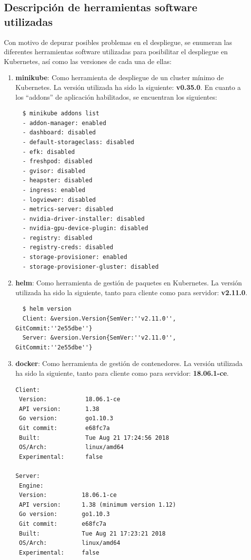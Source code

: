 \documentclass[12pt,spanish]{article}
\begin{document}
\subsection{Descripción de herramientas software utilizadas}
Con motivo de depurar posibles problemas en el despliegue, se enumeran las diferentes herramientas software utilizadas para posibilitar el despliegue en Kubernetes, así como las versiones de cada una de ellas:

\begin{enumerate}
\item{\textbf{minikube}:} Como herramienta de despliegue de un cluster mínimo de Kubernetes. La versión utilizada ha sido la siguiente: \textbf{v0.35.0}.
  En cuanto a los ``addons'' de aplicación habilitados, se encuentran los siguientes:
\begin{verbatim}
  $ minikube addons list
  - addon-manager: enabled
  - dashboard: disabled
  - default-storageclass: disabled
  - efk: disabled
  - freshpod: disabled
  - gvisor: disabled
  - heapster: disabled
  - ingress: enabled
  - logviewer: disabled
  - metrics-server: disabled
  - nvidia-driver-installer: disabled
  - nvidia-gpu-device-plugin: disabled
  - registry: disabled
  - registry-creds: disabled
  - storage-provisioner: enabled
  - storage-provisioner-gluster: disabled
\end{verbatim}

\item{\textbf{helm}:} Como herramienta de gestión de paquetes en Kubernetes. La versión utilizada ha sido la siguiente, tanto para cliente como para servidor: \textbf{v2.11.0}.
\begin{verbatim}
  $ helm version
  Client: &version.Version{SemVer:''v2.11.0'', GitCommit:''2e55dbe''}
  Server: &version.Version{SemVer:''v2.11.0'', GitCommit:''2e55dbe''}
\end{verbatim}

\item{\textbf{docker}:} Como herramienta de gestión de contenedores. La versión utilizada ha sido la siguiente, tanto para cliente como para servidor: \textbf{18.06.1-ce}.
\begin{verbatim}
Client:
 Version:           18.06.1-ce
 API version:       1.38
 Go version:        go1.10.3
 Git commit:        e68fc7a
 Built:             Tue Aug 21 17:24:56 2018
 OS/Arch:           linux/amd64
 Experimental:      false

Server:
 Engine:
 Version:          18.06.1-ce
 API version:      1.38 (minimum version 1.12)
 Go version:       go1.10.3
 Git commit:       e68fc7a
 Built:            Tue Aug 21 17:23:21 2018
 OS/Arch:          linux/amd64
 Experimental:     false
\end{verbatim}

\end{enumerate}
\end{document}
